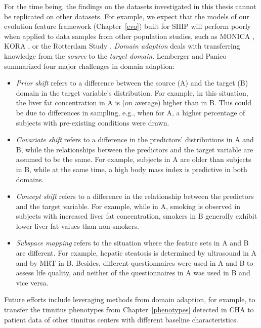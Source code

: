 \documentclass[
  oneside]{book}
\providecommand{\tightlist}{%
  \setlength{\itemsep}{0pt}\setlength{\parskip}{0pt}}
\begin{document}
For the time being, the findings on the datasets investigated in this thesis cannot be replicated on other datasets.
For example, we expect that the models of our evolution feature framework (Chapter~\ref{evo}) built for SHIP will perform poorly when applied to data samples from other population studies, such as MONICA \autocite{who1988world}, KORA \autocite{holle2005kora}, or the Rotterdam Study \autocite{hofman2009rotterdam}.
\emph{Domain adaption} deals with transferring knowledge from the \emph{source} to the \emph{target domain}.
Lemberger and Panico \autocite{lemberger2020primer} summarized four major challenges in domain adaption:

\begin{itemize}
\tightlist
\item
  \emph{Prior shift} refers to a difference between the source (A) and the target (B) domain in the target variable's distribution. For example, in this situation, the liver fat concentration in A is (on average) higher than in B. This could be due to differences in sampling, e.g., when for A, a higher percentage of subjects with pre-existing conditions were drawn.
\item
  \emph{Covariate shift} refers to a difference in the predictors' distributions in A and B, while the relationships between the predictors and the target variable are assumed to be the same. For example, subjects in A are older than subjects in B, while at the same time, a high body mass index is predictive in both domains.
\item
  \emph{Concept shift} refers to a difference in the relationship between the predictors and the target variable. For example, while in A, smoking is observed in subjects with increased liver fat concentration, smokers in B generally exhibit lower liver fat values than non-smokers.
\item
  \emph{Subspace mapping} refers to the situation where the feature sets in A and B are different. For example, hepatic steatosis is determined by ultrasound in A and by MRT in B. Besides, different questionnaires were used in A and B to assess life quality, and neither of the questionnaires in A was used in B and vice versa.
\end{itemize}

Future efforts include leveraging methods from domain adaption, for example, to transfer the tinnitus phenotypes from Chapter~\ref{phenotypes} detected in CHA to patient data of other tinnitus centers with different baseline characteristics.
\end{document}
